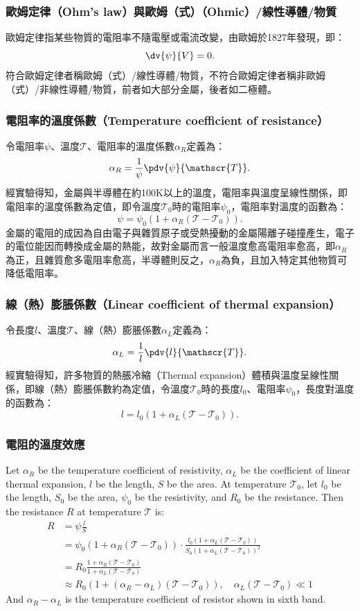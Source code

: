 \documentclass[a4paper,12pt]{report}
\begin{document}
\begin{itemize}
\subsubsection{歐姆定律（Ohm's law）與歐姆（式）（Ohmic）/線性導體/物質}
歐姆定律指某些物質的電阻率不隨電壓或電流改變，由歐姆於1827年發現，即：
\[\dv{\psi}{V}=0.\]
符合歐姆定律者稱歐姆（式）/線性導體/物質，不符合歐姆定律者稱非歐姆（式）/非線性導體/物質，前者如大部分金屬，後者如二極體。
\subsubsection{電阻率的溫度係數（Temperature coefficient of resistance）}
令電阻率$\psi$、溫度$\mathscr{T}$、電阻率的溫度係數$\alpha_R$定義為：
\[\alpha_R=\frac{1}{\psi}\pdv{\psi}{\mathscr{T}}.\]
經實驗得知，金屬與半導體在約100K以上的溫度，電阻率與溫度呈線性關係，即電阻率的溫度係數為定值，即令溫度$\mathscr{T}_0$時的電阻率$\psi_0$，電阻率對溫度的函數為：
\[\psi=\psi_0(1+\alpha_R(\mathscr{T}-\mathscr{T}_0)).\]
金屬的電阻的成因為自由電子與雜質原子或受熱擾動的金屬陽離子碰撞產生，電子的電位能因而轉換成金屬的熱能，故對金屬而言一般溫度愈高電阻率愈高，即$\alpha_R$為正，且雜質愈多電阻率愈高，半導體則反之，$\alpha_R$為負，且加入特定其他物質可降低電阻率。
\subsubsection{線（熱）膨脹係數（Linear coefficient of thermal expansion）}
令長度$l$、溫度$\mathscr{T}$、線（熱）膨脹係數$\alpha_L$定義為：
\[\alpha_L=\frac{1}{l}\pdv{l}{\mathscr{T}}.\]
經實驗得知，許多物質的熱脹冷縮（Thermal expansion）體積與溫度呈線性關係，即線（熱）膨脹係數約為定值，令溫度$\mathscr{T}_0$時的長度$l_0$、電阻率$\psi_0$，長度對溫度的函數為：
\[ l= l_0(1+\alpha_L(\mathscr{T}-\mathscr{T}_0)).\]
\subsubsection{電阻的溫度效應}
Let $\alpha_R$ be the temperature coefficient of resistivity, $\alpha_L$ be the coefficient of linear thermal expansion, $l$ be the length, $S$ be the area. At temperature $\mathscr{T}_0$, let $l_0$ be the length, $S_0$ be the area, $\psi_0$ be the resistivity, and $R_0$ be the resistance. Then the resistance $R$ at temperature $\mathscr{T}$ is:
\[\begin{aligned}
R&=\psi\frac{l}{S}\\
&=\psi_0(1+\alpha_R(\mathscr{T}-\mathscr{T}_0))\cdot\frac{l_0(1+\alpha_L(\mathscr{T}-\mathscr{T}_0))}{S_0(1+\alpha_L(\mathscr{T}-\mathscr{T}_0))^2}\\
&=R_0\frac{1+\alpha_R(\mathscr{T}-\mathscr{T}_0)}{1+\alpha_L(\mathscr{T}-\mathscr{T}_0)}\\
&\approx R_0(1+(\alpha_R-\alpha_L)(\mathscr{T}-\mathscr{T}_0)),\quad \alpha_L(\mathscr{T}-\mathscr{T}_0)\ll 1
\end{aligned}\]
And $\alpha_R-\alpha_L$ is the temperature coefficient of resistor shown in sixth band.


\end{itemize}
\end{document}
